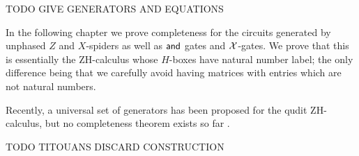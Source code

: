 TODO GIVE GENERATORS AND EQUATIONS

In the following chapter we prove completeness for the circuits generated by unphased $Z$ and $X$-spiders as well as ${\sf and}$ gates and $\cal X$-gates.  We prove that this is essentially the ZH-calculus whose $H$-boxes have natural number label; the only difference being that we carefully avoid having matrices with entries which are not natural numbers.

Recently, a universal set of generators has been proposed for the qudit ZH-calculus, but no completeness theorem exists so far \cite{roy}.



TODO TITOUANS DISCARD CONSTRUCTION

%
%
%
